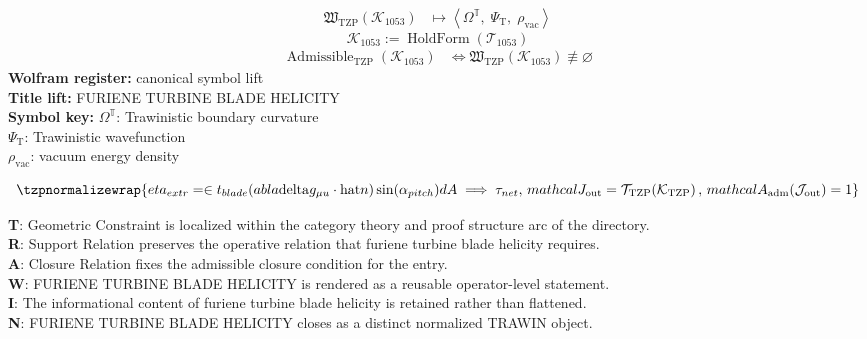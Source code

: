 \noindent
\begin{minipage}[t]{0.48\linewidth}
\begingroup
\small
\[
\begin{aligned}
\mathfrak{W}_{\mathrm{TZP}}\!\left(\mathcal{K}_{1053}\right)
&\longmapsto
\left\langle \Omega^{\mathbb{T}},\; \Psi_{\mathrm{T}},\; \rho_{\mathrm{vac}} \right\rangle
\end{aligned}
\]
\[
\mathcal{K}_{1053}
:=
\operatorname{HoldForm}\!\left(\mathcal{T}_{1053}\right)
\]
\[
\begin{aligned}
\operatorname{Admissible}_{\mathrm{TZP}}\!\left(\mathcal{K}_{1053}\right)
&\Longleftrightarrow
\mathfrak{W}_{\mathrm{TZP}}\!\left(\mathcal{K}_{1053}\right)\not\equiv\varnothing
\end{aligned}
\]
\textbf{Wolfram register:} canonical symbol lift\\
\textbf{Title lift:} FURIENE TURBINE BLADE HELICITY\\
\textbf{Symbol key:} \(\Omega^{\mathbb{T}}\): Trawinistic boundary curvature\\ \(\Psi_{\mathrm{T}}\): Trawinistic wavefunction\\ \(\rho_{\mathrm{vac}}\): vacuum energy density
\par
\endgroup
\end{minipage}\hfill
\begin{minipage}[t]{0.48\linewidth}
\[
\tzpnormalizewrap{eta_{extr} = \in t_{blade} ( abla \mathrm{delta} g_{\mu u} \cdot \mathrm{hat}{n}) \sin(\alpha_{pitch}) dA \implies \tau_{net},\,mathcal{J}_{\mathrm{out}} = \mathcal{T}_{\mathrm{TZP}}\!\left(\mathcal{K}_{\mathrm{TZP}}\right),\,mathcal{A}_{\mathrm{adm}}\!\left(\mathcal{J}_{\mathrm{out}}\right)=1}
\]

\small
\textbf{T}: Geometric Constraint is localized within the category theory and proof structure arc of the directory.\\
\textbf{R}: Support Relation preserves the operative relation that furiene turbine blade helicity requires.\\
\textbf{A}: Closure Relation fixes the admissible closure condition for the entry.\\
\textbf{W}: FURIENE TURBINE BLADE HELICITY is rendered as a reusable operator-level statement.\\
\textbf{I}: The informational content of furiene turbine blade helicity is retained rather than flattened.\\
\textbf{N}: FURIENE TURBINE BLADE HELICITY closes as a distinct normalized TRAWIN object.
\normalsize
\end{minipage}


